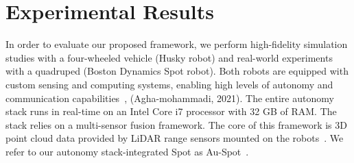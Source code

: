 \documentclass[letterpaper]{article} %
\newcommand{\ph}[1]{{\textbf{#1}:}} %
\begin{document}



\section{Experimental Results}\label{sec:exp_results}
In order to evaluate our proposed framework, we perform high-fidelity simulation studies with a four-wheeled vehicle (Husky robot) and real-world experiments with a quadruped (Boston Dynamics Spot robot). Both robots are equipped with custom sensing and computing systems, enabling high levels of autonomy and communication capabilities~\cite{Otsu2020}, (Agha-mohammadi, 2021). The entire autonomy stack runs in real-time on an Intel Core i7 processor with 32 GB of RAM. The stack relies on a multi-sensor fusion framework. The core of this framework is 3D point cloud data provided by LiDAR range sensors mounted on the robots~\cite{Ebadi2020}. We refer to our autonomy stack-integrated Spot as Au-Spot~\cite{AutoSpot}.
\end{document}
